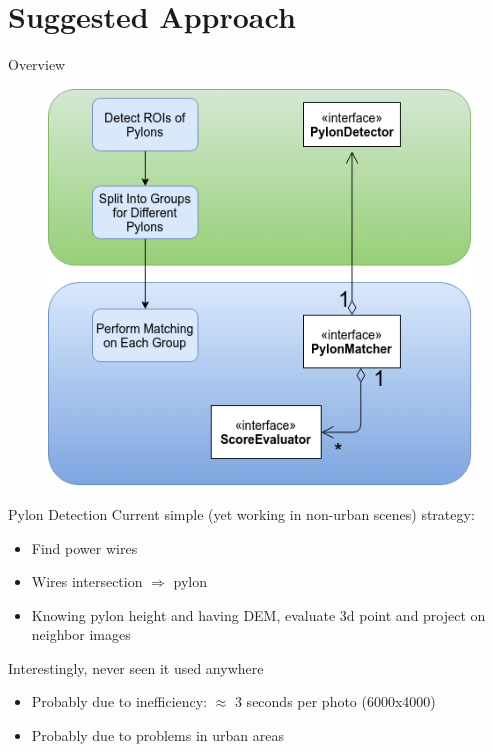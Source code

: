 \documentclass{beamer}
\begin{document}
\section{Suggested Approach}

\begin{frame}[t, fragile]{Overview}
\begin{figure}
\centering
\includegraphics[scale=0.5]{Pipeline}
\end{figure}
\end{frame}

\begin{frame}[t, fragile]{Pylon Detection}
Current simple (yet working in non-urban scenes) strategy:
\begin{itemize}
\item Find power wires
\item Wires intersection $\Rightarrow$ pylon
\item Knowing pylon height and having DEM, evaluate 3d point and project on neighbor images
\end{itemize}
Interestingly, never seen it used anywhere
\begin{itemize}
\item Probably due to inefficiency: $\approx$ 3 seconds per photo (6000x4000)
\item Probably due to problems in urban areas
\end{itemize}
\end{frame}
\end{document}
